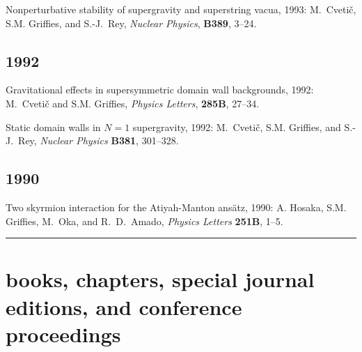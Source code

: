 \begin{etaremune}
\item Nonperturbative stability of supergravity and superstring vacua, 1993: M.\ Cveti\v c, S.M. Grif\/f\/ies, and S.-J.\ Rey, {\em Nuclear Physics}, {\bf B389}, 3--24.

\subsection*{\sc \color{Maroon} 1992}
 
\item Gravitational effects in supersymmetric domain wall backgrounds, 1992: M.\ Cveti\v c and S.M. Grif\/f\/ies, {\em Physics Letters}, {\bf 285B}, 27--34.

\item Static domain walls in $N=1$ supergravity, 1992: M.\ Cveti\v c, S.M. Grif\/f\/ies, and S.-J.\ Rey, {\em Nuclear Physics} {\bf B381}, 301--328.

\subsection*{\sc \color{Maroon} 1990}

\item Two skyrmion interaction for the Atiyah-Manton ans\"atz, 1990:  A. Hosaka, S.M. Grif\/f\/ies, M.\ Oka, and R.\ D.\ Amado, {\it Physics Letters} {\bf 251B}, 1--5.


\end{etaremune}

\noindent\rule{\textwidth}{1pt}
\vspace{-1cm}
\section*{\sc \color{Maroon} books, chapters, special journal editions, and conference proceedings}



